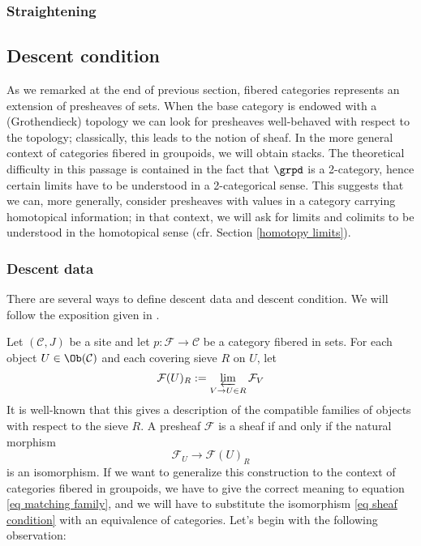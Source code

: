 \subsubsection{Straightening}

\subsection{Descent condition}

As we remarked at the end of previous section, fibered categories represents an extension of presheaves of sets. When the base category is endowed with a (Grothendieck) topology we can look for presheaves well-behaved with respect to the topology; classically, this leads to the notion of sheaf. In the more general context of categories fibered in groupoids, we will obtain stacks. The theoretical difficulty in this passage is contained in the fact that $\grpd$ is a 2-category, hence certain limits have to be understood in a 2-categorical sense. This suggests that we can, more generally, consider presheaves with values in a category carrying homotopical information; in that context, we will ask for limits and colimits to be understood in the homotopical sense (cfr. Section \ref{homotopy limits}).

\subsubsection*{Descent data}

There are several ways to define descent data and descent condition. We will follow the exposition given in .

Let $(\mathcal C, J)$ be a site and let $p \colon \mathcal F \to \mathcal C$ be a category fibered in sets. For each object $U \in \Ob(\mathcal C)$ and each covering sieve $R$ on $U$, let
\begin{equation} \label{eq matching family}
\mathcal F(U)_R := \varprojlim_{V \to U \in R} \mathcal F_V
\end{equation}
It is well-known that this gives a description of the compatible families of objects with respect to the sieve $R$. A presheaf $\mathcal F$ is a sheaf if and only if the natural morphism
\begin{equation} \label{eq sheaf condition}
\mathcal F_U \to \mathcal F(U)_R
\end{equation}
is an isomorphism. If we want to generalize this construction to the context of categories fibered in groupoids, we have to give the correct meaning to equation \eqref{eq matching family}, and we will have to substitute the isomorphism \eqref{eq sheaf condition} with an equivalence of categories. Let's begin with the following observation:


